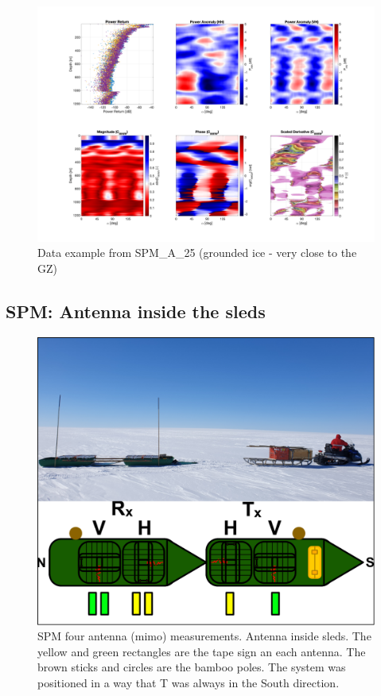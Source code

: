 \documentclass[a4paper,12pt]{article}
\begin{document}
\begin{figure}[H]
	\includegraphics[width=\linewidth]{Figures/SPM_A_25.png}
	\caption{Data example from SPM\_A\_25 (grounded ice - very close to the GZ)}
	\label{fig_SPM_A_25}
\end{figure}

\subsection{SPM: Antenna inside the sleds}
\begin{figure}[H]
	\includegraphics[width=\linewidth]{Figures/SPM_OnSled.pdf}
	\caption{SPM four antenna (mimo) measurements. Antenna inside sleds.
  The yellow and green rectangles are the tape sign an each antenna. 
  The brown sticks and circles are the bamboo poles. 
  The system was positioned in a way that T was always in the South direction.}
	\label{fig_SPM_sled}
\end{figure}
\end{document}
